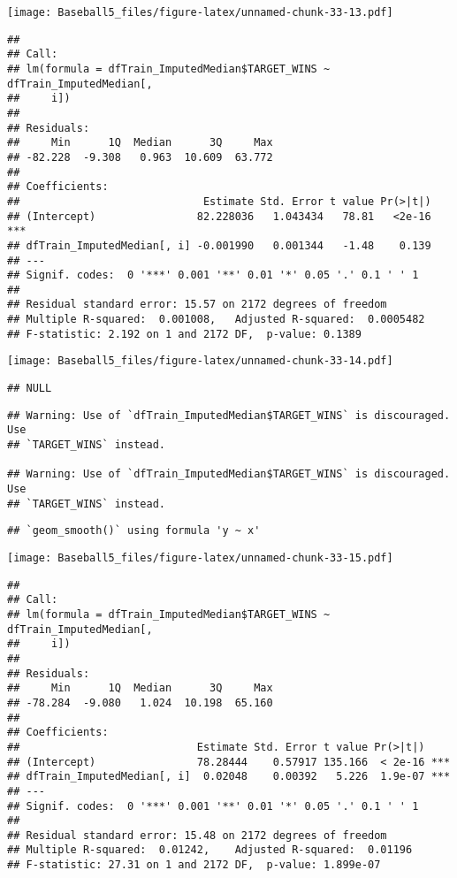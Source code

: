 \documentclass[
]{article}
\begin{document}
\texttt{[image: Baseball5\_files/figure-latex/unnamed-chunk-33-13.pdf]}

\begin{verbatim}
## 
## Call:
## lm(formula = dfTrain_ImputedMedian$TARGET_WINS ~ dfTrain_ImputedMedian[, 
##     i])
## 
## Residuals:
##     Min      1Q  Median      3Q     Max 
## -82.228  -9.308   0.963  10.609  63.772 
## 
## Coefficients:
##                             Estimate Std. Error t value Pr(>|t|)    
## (Intercept)                82.228036   1.043434   78.81   <2e-16 ***
## dfTrain_ImputedMedian[, i] -0.001990   0.001344   -1.48    0.139    
## ---
## Signif. codes:  0 '***' 0.001 '**' 0.01 '*' 0.05 '.' 0.1 ' ' 1
## 
## Residual standard error: 15.57 on 2172 degrees of freedom
## Multiple R-squared:  0.001008,   Adjusted R-squared:  0.0005482 
## F-statistic: 2.192 on 1 and 2172 DF,  p-value: 0.1389
\end{verbatim}

\texttt{[image: Baseball5\_files/figure-latex/unnamed-chunk-33-14.pdf]}

\begin{verbatim}
## NULL
\end{verbatim}

\begin{verbatim}
## Warning: Use of `dfTrain_ImputedMedian$TARGET_WINS` is discouraged. Use
## `TARGET_WINS` instead.

## Warning: Use of `dfTrain_ImputedMedian$TARGET_WINS` is discouraged. Use
## `TARGET_WINS` instead.
\end{verbatim}

\begin{verbatim}
## `geom_smooth()` using formula 'y ~ x'
\end{verbatim}

\texttt{[image: Baseball5\_files/figure-latex/unnamed-chunk-33-15.pdf]}

\begin{verbatim}
## 
## Call:
## lm(formula = dfTrain_ImputedMedian$TARGET_WINS ~ dfTrain_ImputedMedian[, 
##     i])
## 
## Residuals:
##     Min      1Q  Median      3Q     Max 
## -78.284  -9.080   1.024  10.198  65.160 
## 
## Coefficients:
##                            Estimate Std. Error t value Pr(>|t|)    
## (Intercept)                78.28444    0.57917 135.166  < 2e-16 ***
## dfTrain_ImputedMedian[, i]  0.02048    0.00392   5.226  1.9e-07 ***
## ---
## Signif. codes:  0 '***' 0.001 '**' 0.01 '*' 0.05 '.' 0.1 ' ' 1
## 
## Residual standard error: 15.48 on 2172 degrees of freedom
## Multiple R-squared:  0.01242,    Adjusted R-squared:  0.01196 
## F-statistic: 27.31 on 1 and 2172 DF,  p-value: 1.899e-07
\end{verbatim}
\end{document}
